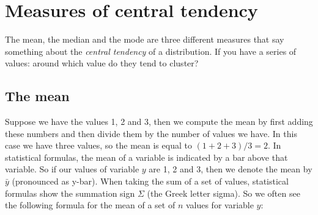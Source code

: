 \documentclass[]{book}\usepackage[]{graphicx}\usepackage[]{color}
\begin{document}
% 
% 
% 
% 
% 
% 
% 
% 
% 
% 
% 





\section{Measures of central tendency}

The mean, the median and the mode are three different measures that say something about the \textit{central tendency} of a distribution. If you have a series of values: around which value do they tend to cluster?

\subsection{The mean}
Suppose we have the values 1, 2 and 3, then we compute the mean by first adding these numbers and then divide them by the number of values we have. In this case we have three values, so the mean is equal to $(1 + 2 + 3)/3 = 2$. In statistical formulas, the mean of a variable is indicated by a bar above that variable. So if our values of variable $y$ are 1, 2 and 3, then we denote the mean by $\bar{y}$ (pronounced as y-bar). When taking the sum of a set of values, statistical formulas show the summation sign $\Sigma$ (the Greek letter sigma). So we often see the following formula for the mean of a set of $n$ values for variable $y$:
\end{document}
